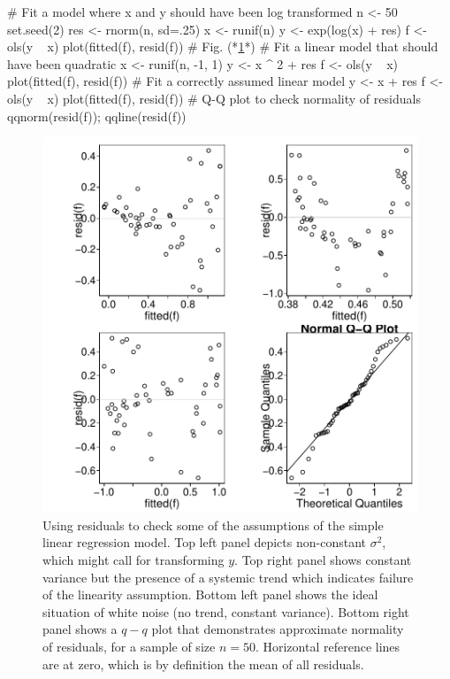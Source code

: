 \begin{Schunk}
\begin{Sinput}
# Fit a model where x and y should have been log transformed
n <- 50
set.seed(2)
res <- rnorm(n, sd=.25)
x <- runif(n)
y <- exp(log(x) + res)
f <- ols(y ~ x)
plot(fitted(f), resid(f))    # Fig. (*\ref{fig:reg-exresid}*)
# Fit a linear model that should have been quadratic
x <- runif(n, -1, 1)
y <- x ^ 2 + res
f <- ols(y ~ x)
plot(fitted(f), resid(f))
# Fit a correctly assumed linear model
y <- x + res
f <- ols(y ~ x)
plot(fitted(f), resid(f))
# Q-Q plot to check normality of residuals
qqnorm(resid(f)); qqline(resid(f))
\end{Sinput}
\begin{figure}[htbp]

\centerline{\includegraphics[width=\maxwidth]{reg-exresid-1} }

\caption[Four examples of residual plots]{Using residuals to check some of the assumptions of the simple linear regression model.  Top left panel depicts non-constant $\sigma^2$, which might call for transforming $y$.  Top right panel shows constant variance but the presence of a systemic trend which indicates failure of the linearity assumption.  Bottom left panel shows the ideal situation of white noise (no trend, constant variance).  Bottom right panel shows a $q-q$ plot that demonstrates approximate normality of residuals, for a sample of size $n=50$.  Horizontal reference lines are at zero, which is by definition the mean of all residuals.}\label{fig:reg-exresid}
\end{figure}
\end{Schunk}
\clearpage

